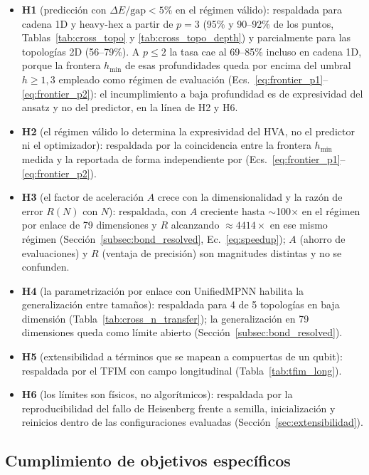 \documentclass[11pt,a4paper,spanish]{book}
\begin{document}
\begin{itemize}
    \item \textbf{H1} (predicción con $\Delta E/\text{gap} < 5\%$ en el régimen válido): respaldada para cadena 1D y heavy-hex a partir de $p = 3$ (95\% y 90--92\% de los puntos, Tablas~\ref{tab:cross_topo} y \ref{tab:cross_topo_depth}) y parcialmente para las topologías 2D (56--79\%). A $p \leq 2$ la tasa cae al 69--85\% incluso en cadena 1D, porque la frontera $h_{\min}$ de esas profundidades queda por encima del umbral $h \geq 1,3$ empleado como régimen de evaluación (Ecs.~\ref{eq:frontier_p1}--\ref{eq:frontier_p2}): el incumplimiento a baja profundidad es de expresividad del ansatz y no del predictor, en la línea de H2 y H6.
    \item \textbf{H2} (el régimen válido lo determina la expresividad del HVA, no el predictor ni el optimizador): respaldada por la coincidencia entre la frontera $h_{\min}$ medida y la reportada de forma independiente por \citet{tripathi2026} (Ecs.~\ref{eq:frontier_p1}--\ref{eq:frontier_p2}).
    \item \textbf{H3} (el factor de aceleración $A$ crece con la dimensionalidad y la razón de error $R(N)$ con $N$): respaldada, con $A$ creciente hasta $\sim$100$\times$ en el régimen por enlace de 79 dimensiones y $R$ alcanzando $\approx 4414\times$ en ese mismo régimen (Sección~\ref{subsec:bond_resolved}, Ec.~\ref{eq:speedup}); $A$ (ahorro de evaluaciones) y $R$ (ventaja de precisión) son magnitudes distintas y no se confunden.
    \item \textbf{H4} (la parametrización por enlace con UnifiedMPNN habilita la generalización entre tamaños): respaldada para 4 de 5 topologías en baja dimensión (Tabla~\ref{tab:cross_n_transfer}); la generalización en 79 dimensiones queda como límite abierto (Sección~\ref{subsec:bond_resolved}).
    \item \textbf{H5} (extensibilidad a términos que se mapean a compuertas de un qubit): respaldada por el TFIM con campo longitudinal (Tabla~\ref{tab:tfim_long}).
    \item \textbf{H6} (los límites son físicos, no algorítmicos): respaldada por la reproducibilidad del fallo de Heisenberg frente a semilla, inicialización y reinicios dentro de las configuraciones evaluadas (Sección~\ref{sec:extensibilidad}).
\end{itemize}

\subsection{Cumplimiento de objetivos específicos}
\end{document}
